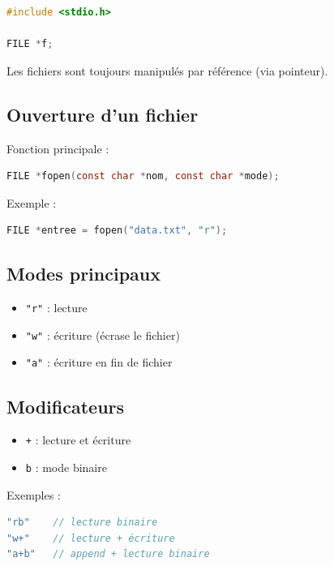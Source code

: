 \begin{lstlisting}[language=C]
#include <stdio.h>

FILE *f;
\end{lstlisting}

Les fichiers sont toujours manipulés par référence (via pointeur).

\subsection{Ouverture d’un fichier}

Fonction principale :

\begin{lstlisting}[language=C]
FILE *fopen(const char *nom, const char *mode);
\end{lstlisting}

Exemple :

\begin{lstlisting}[language=C]
FILE *entree = fopen("data.txt", "r");
\end{lstlisting}

\subsection{Modes principaux}

\begin{itemize}
    \item \texttt{"r"} : lecture
    \item \texttt{"w"} : écriture (écrase le fichier)
    \item \texttt{"a"} : écriture en fin de fichier
\end{itemize}

\subsection{Modificateurs}

\begin{itemize}
    \item \texttt{+} : lecture et écriture
    \item \texttt{b} : mode binaire
\end{itemize}

Exemples :

\begin{lstlisting}[language=C]
"rb"    // lecture binaire
"w+"    // lecture + écriture
"a+b"   // append + lecture binaire
\end{lstlisting}

